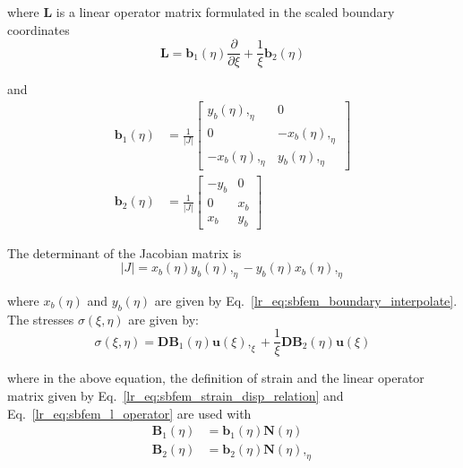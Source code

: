 where $\mathbf{L}$ is a linear operator matrix formulated in the scaled boundary coordinates
\begin{equation}
    \mathbf{L} =    \mathbf{b}_1(\eta) \frac{\partial}{\partial \xi} +
                    \frac{1}{\xi} \mathbf{b}_2(\eta)
    \label{lr_eq:sbfem_l_operator}
\end{equation}

and
\begin{equation}
    \begin{aligned}
    \mathbf{b}_1(\eta) & = \frac{1}{|J|}
            \begin{bmatrix}
                y_b(\eta),_{\eta}   &   0   \\
                0   &   -x_b(\eta),_{\eta}  \\
                -x_b(\eta),_{\eta} & y_b(\eta),_{\eta}
            \end{bmatrix} \\
    \mathbf{b}_2(\eta) & = \frac{1}{|J|}
            \begin{bmatrix}
                -y_b    &   0   \\
                0       &   x_b \\
                x_b     &   y_b
            \end{bmatrix}
    \end{aligned}
    \label{lr_eq:sbfem_little_b}
\end{equation}

The determinant of the Jacobian matrix is
\begin{equation}
    |J| = x_b(\eta)y_b(\eta),_{\eta}
        - y_b(\eta)x_b(\eta),_{\eta}
    \label{lr_eq:sbfem_Jdet}
\end{equation}

where $x_b(\eta)$ and $y_b(\eta)$ are given by Eq.~\ref{lr_eq:sbfem_boundary_interpolate}.
The stresses $\sigma(\xi,\eta)$ are given by:
\begin{equation}
    \sigma(\xi,\eta) =  \mathbf{DB}_1(\eta) \mathbf{u}(\xi),_{\xi} +
                        \frac{1}{\xi} \mathbf{DB}_2(\eta) \mathbf{u}(\xi)
    \label{lr_eq:sbfem_stress}
\end{equation}

where in the above equation, the definition of strain and the linear operator matrix given by Eq.~\ref{lr_eq:sbfem_strain_disp_relation} and Eq.~\ref{lr_eq:sbfem_l_operator} are used with
\begin{equation}
    \begin{aligned}
        \mathbf{B}_1(\eta) &= \mathbf{b}_1(\eta) \mathbf{N}(\eta)    \\
        \mathbf{B}_2(\eta) &= \mathbf{b}_2(\eta) \mathbf{N}(\eta),_{\eta}
        \label{lr_eq:sbfem_captial_b}
    \end{aligned}
\end{equation}

